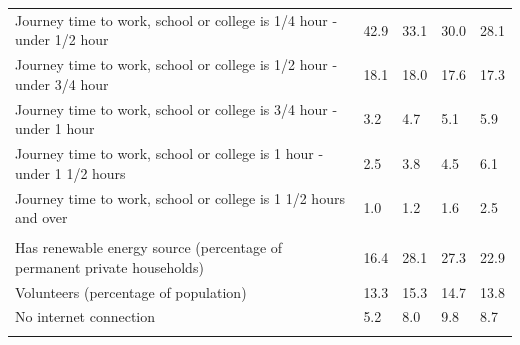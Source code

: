\documentclass{article}
\begin{document}
\begin{table}[h]
\begin{tabular}{KTTTT}
Journey time to work, school or college is 1/4 hour - under 1/2 hour & 42.9& 33.1& 30.0& 28.1\\
Journey time to work, school or college is 1/2 hour - under 3/4 hour & 18.1& 18.0& 17.6& 17.3\\
Journey time to work, school or college is 3/4 hour - under 1 hour & 3.2& 4.7& 5.1& 5.9\\
Journey time to work, school or college is 1 hour - under 1 1/2 hours & 2.5& 3.8& 4.5& 6.1\\
Journey time to work, school or college is 1 1/2 hours and over & 1.0& 1.2& 1.6& 2.5\\
\hline
    \\ 
    \hline
Has renewable energy source (percentage of permanent private households) & 16.4& 28.1& 27.3& 22.9\\
    \hline
Volunteers (percentage of population) & 13.3& 15.3& 14.7& 13.8\\
    \hline
No internet connection& 5.2& 8.0& 9.8& 8.7\\
\hline
\end{tabular}
\end{table}
\end{document}
